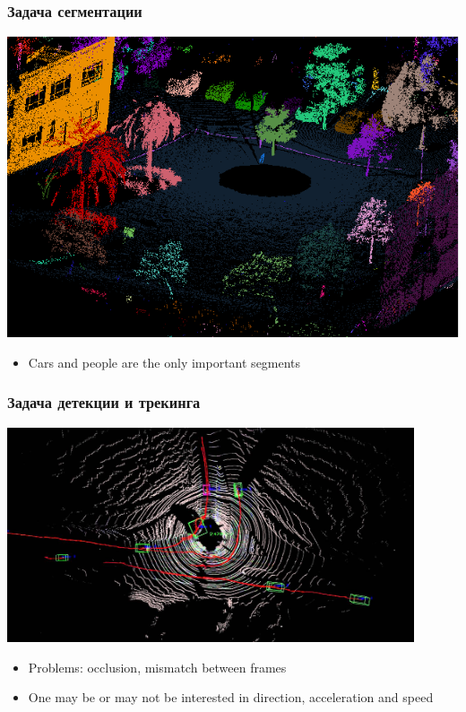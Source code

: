\documentclass[xcolor=table,usenames,dvipsnames]{beamer}
\begin{document}
\begin{frame}
\frametitle{Задача сегментации}
\begin{center}
\includegraphics[height=0.7\textheight]{img/segmentation.png}
\end{center}
\begin{itemize}
\item Cars and people are the only important segments
\end{itemize}
\end{frame}
\begin{frame}
\frametitle{Задача детекции и трекинга}
\begin{center}
\includegraphics[width=0.9\textwidth]{img/tracking.jpg}
\end{center}
\begin{itemize}
\item Problems: occlusion, mismatch between frames
\item One may be or may not be interested in direction, acceleration and speed
\end{itemize}
\end{frame}
\end{document}
